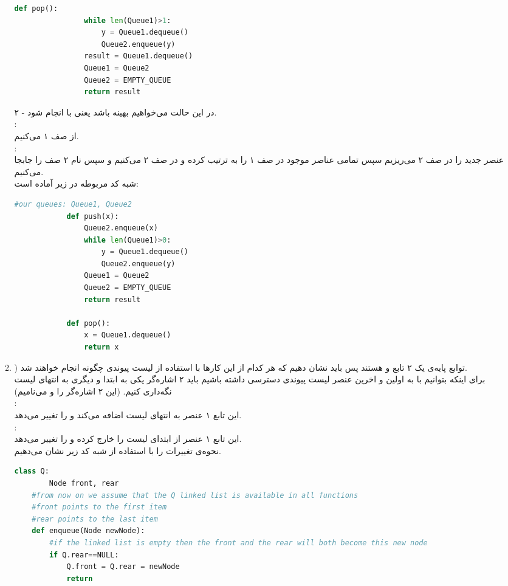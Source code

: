 \documentclass{article}
\begin{document}
\begin{enumerate}
\begin{enumerate}
\begin{latin}
\begin{flushright}
\begin{lstlisting}[language=Python]
			def pop():
				while len(Queue1)>1:
					y = Queue1.dequeue()
					Queue2.enqueue(y)
				result = Queue1.dequeue()
				Queue1 = Queue2
				Queue2 = EMPTY_QUEUE
				return result
			\end{lstlisting}
			\end{flushright}								
			\end{latin}
			۲ - در این حالت می‌خواهیم  بهینه باشد یعنی با  انجام شود.\\
			:\\
			از صف ۱  می‌کنیم. \\
			: \\
			عنصر جدید را در صف ۲ می‌ریزیم سپس تمامی عناصر موجود در صف ۱ را به ترتیب  کرده و در صف ۲   می‌کنیم و سپس نام ۲ صف را جابجا می‌کنیم.\\ 
			شبه کد مربوطه در زیر آماده است:
			\begin{latin}
			\begin{flushright}				
			\begin{lstlisting}[language=Python]
			#our queues: Queue1, Queue2
			def push(x):
				Queue2.enqueue(x)
				while len(Queue1)>0:
					y = Queue1.dequeue()
					Queue2.enqueue(y)
				Queue1 = Queue2
				Queue2 = EMPTY_QUEUE
				return result

			def pop():
				x = Queue1.dequeue()
				return x
			\end{lstlisting}
			\end{flushright}								
			\end{latin}
			\item)  توابع پایه‌ی یک  ۲ تابع  و  هستند پس باید نشان دهیم که هر کدام از این کار‌ها با استفاده از لیست پیوندی چگونه انجام خواهند شد.\\
			برای اینکه بتوانیم با  به اولین و اخرین عنصر لیست پیوندی دسترسی داشته باشیم باید ۲ اشاره‌گر یکی به ابتدا و دیگری به انتهای لیست نگه‌داری کنیم. (این ۲ اشاره‌گر را  و  می‌نامیم)\\
			:\\
			این تابع ۱ عنصر به انتهای لیست اضافه می‌کند و  را تغییر می‌دهد. \\
			:\\
			این تابع ۱ عنصر از ابتدا‌ی لیست را خارج کرده و  را تغییر می‌دهد.\\
			نحوه‌ی تغییرات را با استفاده از شبه کد زیر نشان می‌دهیم. 
	\begin{latin}
	\begin{flushright}				
	\begin{lstlisting}[language=Python]
	class Q:
		Node front, rear
	#from now on we assume that the Q linked list is available in all functions
	#front points to the first item
	#rear points to the last item
	def enqueue(Node newNode):
		#if the linked list is empty then the front and the rear will both become this new node
		if Q.rear==NULL:
			Q.front = Q.rear = newNode
			return


\end{lstlisting}
\end{flushright}
\end{latin}
\end{enumerate}
\end{enumerate}
\end{document}
